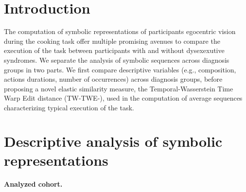 \begin{chapterabstract}




\section{Introduction}
    \label{sec:chapter_6_introduction}

    The computation of symbolic representations of participants egocentric vision during the cooking task offer multiple promising avenues to compare the execution of the task between participants with and without dysexexutive syndromes. We separate the analysis of symbolic sequences across diagnosis groups in two parts. We first compare descriptive variables (e.g., composition, actions durations, number of occurrences) across diagnosis groups, before proposing a novel elastic similarity measure, the Temporal-Wasserstein Time Warp Edit distance (TW-TWE-), used in the computation of average sequences characterizing typical execution of the task.

\section{Descriptive analysis of symbolic representations}
    \label{sec:chapter_6_descriptive_analysis}

    \paragraph{Analyzed cohort.\\}


\end{chapterabstract}

